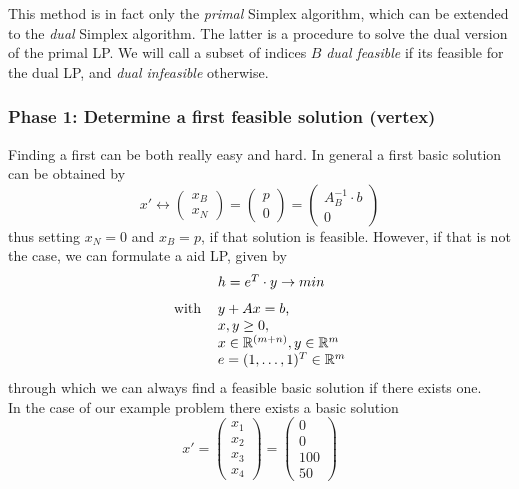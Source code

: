 \documentclass[a4paper, 11pt]{article}
\begin{document}
This method is in fact only the \textit{primal} Simplex algorithm, which can be extended to the \textit{dual} Simplex algorithm. The latter is a procedure to solve the dual version of the primal LP. We will call a subset of indices $B$ \textit{dual feasible} if its feasible for the dual LP, and \textit{dual infeasible} otherwise.


\subsubsection{Phase 1: Determine a first feasible solution (vertex)}
Finding a first can be both really easy and hard. In general a first basic solution can be obtained by 
\begin{equation*}
	x' \longleftrightarrow 
	\left( \begin{array}{c}
		x_B \\ x_N
	\end{array}\right) = \left(\begin{array}{c}
		p \\ 0
	\end{array}\right) = \left(\begin{array}{c}
		A_B^{-1}\cdot b \\ 0
	\end{array}\right)
\end{equation*}
thus setting $x_N=0$ and $x_B=p$, if that solution is feasible. However, if that is not the case, we can formulate a aid LP, given by
\begin{equation}
	\label{hilfsproblem}
	\begin{tabular}{cl}
		&$h = e^T\cdot y \rightarrow min$\vspace{0.25cm}\\
		with&$y+Ax = b$,\\
		&$x, y\geq 0,$\\
		&$x\in \mathbb{R}^{(m+n)}, y\in\mathbb{R}^m$\\
		&$e= (1,\dots,1)^T\in\mathbb{R}^m$
	\end{tabular}
\end{equation}
through which we can always find a feasible basic solution if there exists one.\\
In the case of our example problem there exists a basic solution 
\begin{equation*}
	x' = \left(\begin{array}{c}
		x_1\\x_2\\x_3\\x_4
	\end{array}\right) = \left(\begin{array}{c}
		0\\0\\100\\50
	\end{array}\right)
\end{equation*}
\end{document}
